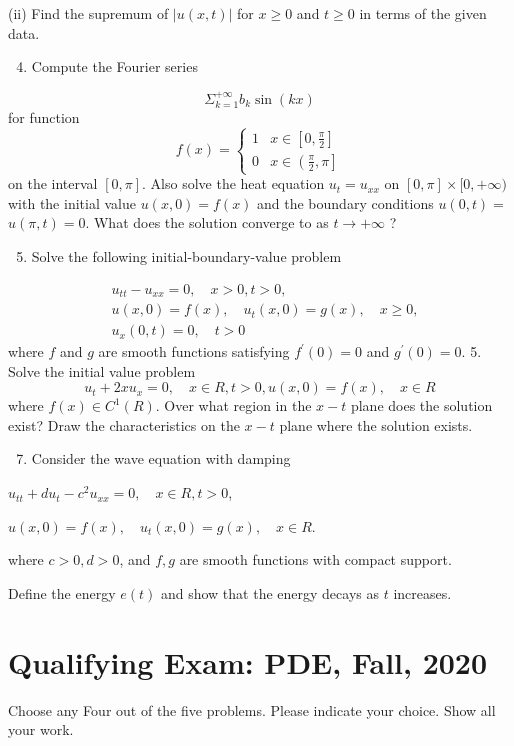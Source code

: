 \documentclass[10pt]{article}
\begin{document}
(ii) Find the supremum of $|u(x, t)|$ for $x \geq 0$ and $t \geq 0$ in terms of the given data.

\begin{enumerate}
  \setcounter{enumi}{3}
  \item Compute the Fourier series
\end{enumerate}
$$
\Sigma_{k=1}^{+\infty} b_{k} \sin (k x)
$$
for function
$$
f(x)= \begin{cases}1 & x \in\left[0, \frac{\pi}{2}\right] \\ 0 & x \in\left(\frac{\pi}{2}, \pi\right]\end{cases}
$$
on the interval $[0, \pi]$. Also solve the heat equation $u_{t}=u_{x x}$ on $[0, \pi] \times[0,+\infty)$ with the initial value $u(x, 0)=f(x)$ and the boundary conditions $u(0, t)=$ $u(\pi, t)=0$. What does the solution converge to as $t \rightarrow+\infty$ ?

\begin{enumerate}
  \setcounter{enumi}{4}
  \item Solve the following initial-boundary-value problem
\end{enumerate}
$$
\begin{aligned}
&u_{t t}-u_{x x}=0, \quad x>0, t>0, \\
&u(x, 0)=f(x), \quad u_{t}(x, 0)=g(x), \quad x \geq 0, \\
&u_{x}(0, t)=0, \quad t>0
\end{aligned}
$$
where $f$ and $g$ are smooth functions satisfying $f^{\prime}(0)=0$ and $g^{\prime}(0)=0$. 5. Solve the initial value problem
$$
u_{t}+2 x u_{x}=0, \quad x \in R, t>0, u(x, 0)=f(x), \quad x \in R
$$
where $f(x) \in C^{1}(R)$. Over what region in the $x-t$ plane does the solution exist? Draw the characteristics on the $x-t$ plane where the solution exists.

\begin{enumerate}
  \setcounter{enumi}{6}
  \item Consider the wave equation with damping
\end{enumerate}
$u_{t t}+d u_{t}-c^{2} u_{x x}=0, \quad x \in R, t>0$,

$u(x, 0)=f(x), \quad u_{t}(x, 0)=g(x), \quad x \in R .$

where $c>0, d>0$, and $f, g$ are smooth functions with compact support.

Define the energy $e(t)$ and show that the energy decays as $t$ increases.

\section{Qualifying Exam: PDE, Fall, 2020}
Choose any Four out of the five problems. Please indicate your choice. Show all your work.
\end{document}
